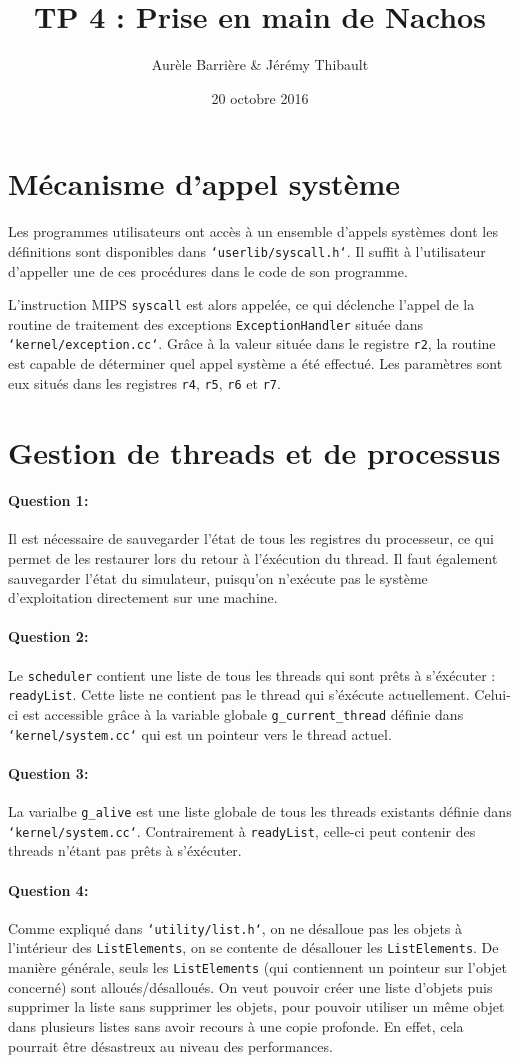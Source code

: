 \documentclass[11pt]{article}
\title{TP 4 : Prise en main de Nachos}
\author{Aurèle Barrière \& Jérémy Thibault}
\date{20 octobre 2016}
\def\question#1{\paragraph{Question #1:}}
\def\pathfile#1{\texttt{`#1`}}
\def\var#1{\texttt{#1}}
\def\func#1{\texttt{#1}}
\def\obj#1{\texttt{#1}}
\begin{document}
\maketitle

\section*{Mécanisme d'appel système}

Les programmes utilisateurs ont accès à un ensemble d'appels systèmes dont les définitions sont disponibles dans \pathfile{userlib/syscall.h}. Il suffit à l'utilisateur d'appeller une de ces procédures dans le code de son programme.

L'instruction MIPS \func{syscall} est alors appelée, ce qui déclenche l'appel de la routine de traitement des exceptions \func{ExceptionHandler} située dans \pathfile{kernel/exception.cc}. Grâce à la valeur située dans le registre \var{r2}, la routine est capable de déterminer quel appel système a été effectué. Les paramètres sont eux situés dans les registres \var{r4}, \var{r5}, \var{r6} et \var{r7}.


\section*{Gestion de threads et de processus}
\question{1} Il est nécessaire de sauvegarder l'état de tous les registres du processeur, ce qui permet de les restaurer lors du retour à l'éxécution du thread. Il faut également sauvegarder l'état du simulateur, puisqu'on n'exécute pas le système d'exploitation directement sur une machine.

\question{2} Le \obj{scheduler} contient une liste de tous les threads qui sont prêts à s'éxécuter : \var{readyList}. Cette liste ne contient pas le thread qui s'éxécute actuellement. Celui-ci est accessible grâce à la variable globale \var{g\_current\_thread} définie dans \pathfile{kernel/system.cc} qui est un pointeur vers le thread actuel.

\question{3} La varialbe \var{g\_alive} est une liste globale de tous les threads existants définie dans \pathfile{kernel/system.cc}. Contrairement à \var{readyList}, celle-ci peut contenir des threads n'étant pas prêts à s'éxécuter.

\question{4}
Comme expliqué dans \pathfile{utility/list.h}, on ne désalloue pas les objets à l'intérieur des \obj{ListElements}, on se contente de désallouer les \obj{ListElements}. De manière générale, seuls les \obj{ListElements} (qui contiennent un pointeur sur l'objet concerné) sont alloués/désalloués. On veut pouvoir créer une liste d'objets puis supprimer la liste sans supprimer les objets, pour pouvoir utiliser un même objet dans plusieurs listes sans avoir recours à une copie profonde. En effet, cela pourrait être désastreux au niveau des performances.
\end{document}
